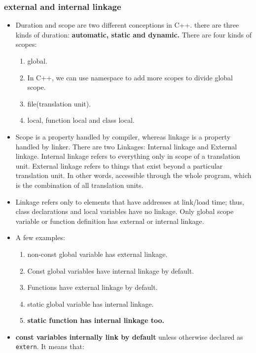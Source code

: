 \documentclass[a4paper,11pt,twoside]{book}
\begin{document}
\subsubsection{external and internal linkage}
\begin{itemize}
	\item Duration and scope are two different conceptions in C++. there are three kinds of duration: \textbf{automatic, static and dynamic.} There are four kinds of scopes:
	\begin{enumerate}
		\item global.
		\item In C++, we can use namespace to add more scopes to divide global scope.
		\item file(translation unit).
		\item local, function local and class local. 
	\end{enumerate}

	\item Scope is a property handled by compiler, whereas linkage is a property handled by linker. There are two Linkages: Internal linkage and External linkage. Internal linkage refers to everything only in scope of a translation unit. External linkage refers to things that exist beyond a particular translation unit. In other words, accessible through the whole program, which is the combination of all translation units.
	
	\item Linkage refers only to elements that have addresses at link/load time; thus, class declarations and local variables have no linkage. Only global scope variable or function definition has external or internal linkage. 
	
	\item A few examples:
\begin{enumerate}
	\item non-const global variable has external linkage.
	\item Const global variables have internal linkage by default.
	\item Functions have external linkage by default.
	\item static global variable has internal linkage.
	\item \textbf{static function has internal linkage too.}
\end{enumerate}

	\item \textbf{const variables internally link by default} unless otherwise declared as \texttt{extern}. It means that:
	


\end{itemize}
\end{document}
